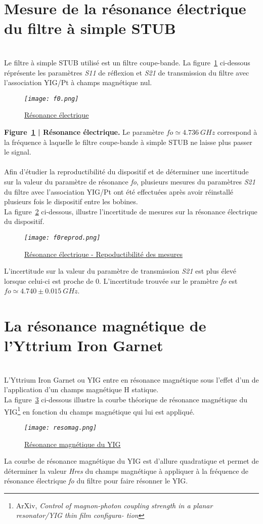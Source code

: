 \documentclass[12pt,fleqn]{book} %
\begin{document}
\section{Mesure de la résonance électrique du filtre à simple STUB}
~\\\indent Le filtre à simple STUB utilisé est un filtre coupe-bande. La figure~\underline{\color{blue}\ref{fo}} ci-dessous réprésente les paramètres \emph{S11} de réflexion et \emph{S21} de transmission du filtre avec l'association YIG/Pt à champs magnétique nul.
\begin{figure}[H]
	\centering
	\itshape
	\texttt{[image: f0.png]}
	\caption{\label{fo} \underline{Résonance électrique}}
\end{figure}
\noindent\footnotesize  \textbf{Figure~\underline{\color{blue}\ref{fo}} | Résonance électrique.} Le paramètre $ fo\simeq4.736\ GHz$ correspond à la fréquence à laquelle le filtre coupe-bande à simple STUB ne laisse plus passer le signal.
~\\\\
\normalsize Afin d'étudier la reproductibilité du dispositif et de déterminer une incertitude sur la valeur du paramètre de résonance \emph{fo}, plusieurs mesures du paramètres \emph{S21} du filtre avec l'association YIG/Pt ont été effectuées après avoir réinstallé plusieurs fois le dispositif entre les bobines. 
~\\La figure~\underline{\color{blue}\ref{foreprod}} ci-dessous, illustre l'incertitude de mesures sur la résonance électrique du dispositif.
\begin{figure}[H]
	\centering
	\itshape
	\texttt{[image: f0reprod.png]}
	\caption{\label{foreprod} \underline{Résonance électrique - Repoductibilité des mesures}}
\end{figure}
\noindent L'incertitude sur la valeur du paramètre de transmission \emph{\emph{S21}} est plus élevé lorsque celui-ci est proche de 0. L'incertitude trouvée sur le pramètre \emph{fo} est $ fo\simeq4.740\pm0.015\ GHz$.
\section{La résonance magnétique de l'Yttrium Iron Garnet}
~\\\indent L'Yttrium Iron Garnet ou YIG entre en résonance magnétique sous l'effet d'un de l'application d'un champs magnétique H statique. 
~\\La figure~\underline{\color{blue}\ref{resomag}} ci-dessous illustre la courbe théorique de résonance magnétique du YIG\footnote{ArXiv, \emph{Control of magnon-photon coupling strength in a planar resonator/YIG thin film configura-
tion}} en fonction du champs magnétique qui lui est appliqué.
\begin{figure}[H]
	\centering
	\itshape
	\texttt{[image: resomag.png]}
	\caption{\label{resomag} \underline{Résonance magnétique du YIG}}
\end{figure}
\noindent La courbe de résonance magnétique du YIG est d'allure quadratique et permet de déterminer la valeur \emph{Hres} du champs magnétique à appliquer à la fréquence de résonance électrique \emph{fo} du filtre pour faire résonner le YIG. 
\end{document}

